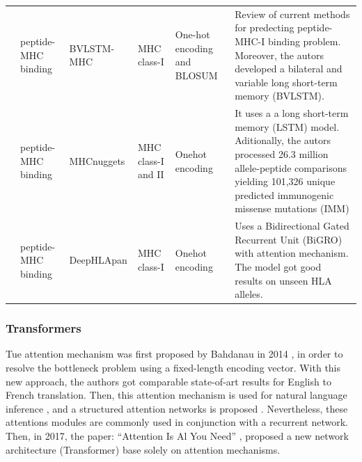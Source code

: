 \begin{table}[]
{\begin{tabular}{p{1.3cm}p{1.6cm}p{2cm}p{1.6cm}p{1.9cm}p{4cm}}
			           \cite{jiang2021predicting} & peptide-MHC binding                     & BVLSTM-MHC                        & MHC class-I        & One-hot encoding and BLOSUM & Review of current methods for predecting peptide-MHC-I binding problem. Moreover, the autors developed a bilateral and variable long short-term memory (BVLSTM).                                                                       \\
			
			           \cite{shao2020high}        & peptide-MHC binding                     & MHCnuggets                        & MHC class-I and II & Onehot encoding             & It uses a a long short-term memory (LSTM) model. Aditionally, the autors processed 26.3 million allele-peptide comparisons yielding 101,326 unique predicted immunogenic missense mutations (IMM)  \\
			
			           \cite{wu2019deephlapan}    & peptide-MHC binding                     & DeepHLApan                        & MHC class-I        & Onehot encoding             & Uses a Bidirectional Gated Recurrent Unit (BiGRO) with attention mechanism. The model got good results on unseen HLA alleles.                                       
		\end{tabular}
	}
\end{table}

\subsubsection{Transformers}

Tue attention mechanism was first proposed by Bahdanau in 2014 \cite{bahdanau2014neural}, in order to resolve the bottleneck problem using a fixed-length encoding vector. With this new approach, the authors got comparable state-of-art results for English to French translation. Then, this attention mechanism is used for natural language inference \cite{parikh2016decomposable}, and a structured attention networks is proposed \cite{kim2017structured}. Nevertheless, these attentions modules are commonly used in conjunction with a recurrent network. Then, in 2017, the paper: ``Attention Is Al You Need'' \cite{vaswani2017attention}, proposed a new network architecture (Transformer) base solely on attention mechanisms. \\



